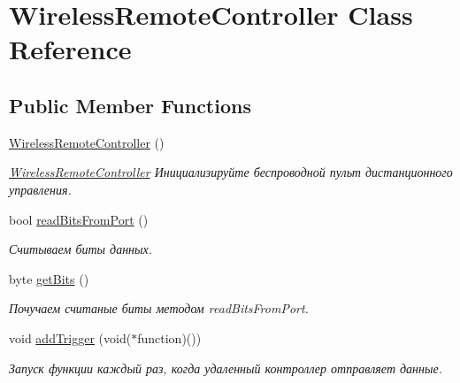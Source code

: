 \hypertarget{class_wireless_remote_controller}{\section{Wireless\-Remote\-Controller Class Reference}
\label{class_wireless_remote_controller}
}
\subsection*{Public Member Functions}
\begin{DoxyCompactItemize}
\item 
\hypertarget{class_wireless_remote_controller_ab8837249a4c68875aeaff238c2fde2a8}{\hyperlink{class_wireless_remote_controller_ab8837249a4c68875aeaff238c2fde2a8}{Wireless\-Remote\-Controller} ()}\label{class_wireless_remote_controller_ab8837249a4c68875aeaff238c2fde2a8}

\begin{DoxyCompactList}\small\item\em \hyperlink{class_wireless_remote_controller}{Wireless\-Remote\-Controller} Инициализируйте беспроводной пульт дистанционного управления. \end{DoxyCompactList}\item 
bool \hyperlink{class_wireless_remote_controller_a9e03515a61eb5b1dc60834b4b9edeb3d}{read\-Bits\-From\-Port} ()
\begin{DoxyCompactList}\small\item\em Считываем биты данных. \end{DoxyCompactList}\item 
byte \hyperlink{class_wireless_remote_controller_a58a26da5d3e98bd4698d3e7b20006afa}{get\-Bits} ()
\begin{DoxyCompactList}\small\item\em Почучаем считаные биты методом read\-Bits\-From\-Port. \end{DoxyCompactList}\item 
void \hyperlink{class_wireless_remote_controller_a4c7990f3944583e47d285b921a817374}{add\-Trigger} (void($\ast$function)())
\begin{DoxyCompactList}\small\item\em Запуск функции каждый раз, когда удаленный контроллер отправляет данные. \end{DoxyCompactList}\end{DoxyCompactItemize}


